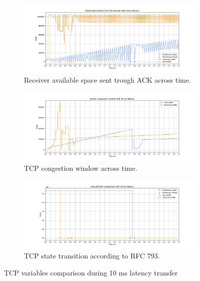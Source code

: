 \documentclass[a4paper,10pt]{article}
\begin{document}
\begin{figure}[]
\begin{subfigure}{\textwidth}
    \centering
    \includegraphics[width=\textwidth]{images/10_wnd_comparison.png}
    \caption{Receiver available space sent trough ACK across time.}
    \label{fig:10ms_wnd}
\end{subfigure}%
\qquad
\begin{subfigure}{\textwidth}
   \centering
   \includegraphics[width=\textwidth]{images/10_cwnd_comparison.png}
    \caption{TCP congestion window across time.}
    \label{fig:10ms_cwnd}
\end{subfigure}
\qquad
\begin{subfigure}{\textwidth}
   \centering
   \includegraphics[width=\textwidth]{images/10_snd_ssthresh_comparison.png}
    \caption{TCP state transition according to RFC 793.}
    \label{fig:10ms_sshth}
\end{subfigure}
\caption[short]{TCP variables comparison during 10 ms latency transfer}
\label{fig:tcp_variables}
\end{figure}
\end{document}
